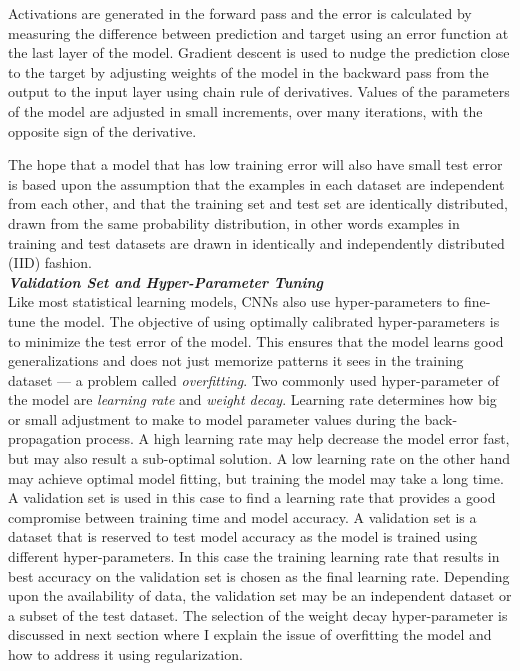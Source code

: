 \documentclass [11pt,letterpaper ,twoside ,openany ]{report}
\begin{document}
    Activations are generated in the forward pass and the error is calculated by measuring the difference between prediction and target using an error function at the last layer of the model. Gradient descent is used to nudge the prediction close to the target by adjusting weights of the model in the backward pass from the output to the input layer using chain rule of derivatives. Values of the parameters of the model are adjusted in small increments, over many iterations, with the opposite sign of the derivative.

    The hope that a model that has low training error will also have small test error is based upon the assumption that the examples in each dataset are independent from each other, and that the training set and test set are identically distributed, drawn from the same probability distribution, in other words examples in training and test datasets are drawn in identically and independently distributed (IID) fashion.\\

    
    \noindent
    \textbf{\textit{Validation Set and Hyper-Parameter Tuning}}\\
    Like most statistical learning models, CNNs also use hyper-parameters to fine-tune the model. The objective of using optimally calibrated hyper-parameters is to minimize the test error of the model. This ensures that the model learns good generalizations and does not just memorize patterns it sees in the training dataset --- a problem called \textit{overfitting}. Two commonly used hyper-parameter of the model are \textit{learning rate} and \textit{weight decay}. Learning rate determines how big or small adjustment to make to model parameter values during the back-propagation process. A high learning rate may help decrease the model error fast, but may also result a sub-optimal solution. A low learning rate on the other hand may achieve optimal model fitting, but training the model may take a long time. A validation set is used in this case to find a learning rate that provides a good compromise between training time and model accuracy. A validation set is a dataset that is reserved to test model accuracy as the model is trained using different hyper-parameters. In this case the training learning rate that results in best accuracy on the validation set is chosen as the final learning rate. Depending upon the availability of data, the validation set may be an independent dataset or a subset of the test dataset. The selection of the weight decay hyper-parameter is discussed in next section where I explain the issue of overfitting the model and how to address it using regularization.\\
\end{document}
